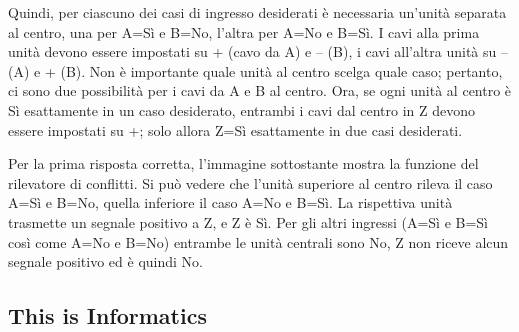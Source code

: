\documentclass[a4paper,11pt]{report}
\newcommand{\taskGraphicsFolder}{..}
\begin{document}
{\centering%
\par}

Quindi, per ciascuno dei casi di ingresso desiderati è necessaria un’unità separata al centro, una per A=Sì e B=No, l’altra per A=No e B=Sì. I cavi alla prima unità devono essere impostati su + (cavo da A) e – (B), i cavi all’altra unità su – (A) e + (B).  Non è importante quale unità al centro scelga quale caso; pertanto, ci sono due possibilità per i cavi da A e B al centro.  Ora, se ogni unità al centro è Sì esattamente in un caso desiderato, entrambi i cavi dal centro in Z devono essere impostati su +; solo allora Z=Sì esattamente in due casi desiderati.

Per la prima risposta corretta, l’immagine sottostante mostra la funzione del rilevatore di conflitti. Si può vedere che l’unità superiore al centro rileva il caso A=Sì e B=No, quella inferiore il caso A=No e B=Sì. La rispettiva unità trasmette un segnale positivo a Z, e Z è Sì. Per gli altri ingressi (A=Sì e B=Sì così come A=No e B=No) entrambe le unità centrali sono No, Z non riceve alcun segnale positivo ed è quindi No.

{\centering%
\raisebox{-0.5ex}{} \raisebox{-0.5ex}{}

\raisebox{-0.5ex}{} \raisebox{-0.5ex}{}\par}


\subsection*{This is Informatics}
\end{document}
